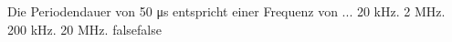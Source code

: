     {Die Periodendauer von 50 μs entspricht einer Frequenz von ...}
    {20 kHz.}
    {2 MHz.}
    {200 kHz.}
    {20 MHz.}
    {false}{false}